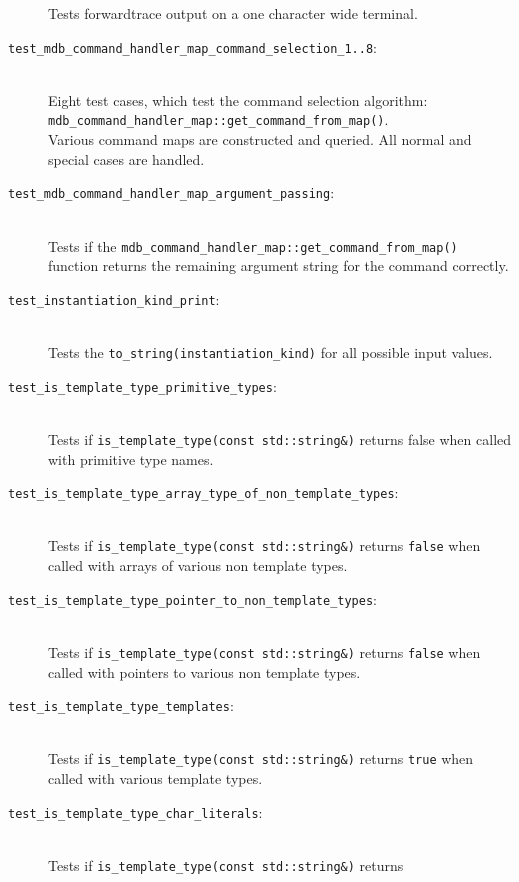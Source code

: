 \begin{description}
        Tests forwardtrace output on a one character wide terminal.
    \item[\texttt{test\_mdb\_command\_handler\_map\_command\_selection\_1..8}:] \hfill \\
        Eight test cases, which test the command selection algorithm: \\
        \texttt{mdb\_command\_handler\_map::get\_command\_from\_map()}. \\
        Various command maps are constructed and queried. All normal and
        special cases are handled.
    \item[\texttt{test\_mdb\_command\_handler\_map\_argument\_passing}:] \hfill \\
        Tests if the
        \texttt{mdb\_command\_handler\_map::get\_command\_from\_map()}
        function returns the remaining argument string for the command
        correctly.
    \item[\texttt{test\_instantiation\_kind\_print}:] \hfill \\
        Tests the \texttt{to\_string(instantiation\_kind)} for all possible
        input values.
    \item[\texttt{test\_is\_template\_type\_primitive\_types}:] \hfill \\
        Tests if \texttt{is\_template\_type(const std::string\&)} returns
        false when called with primitive type names.
    \item[\texttt{test\_is\_template\_type\_array\_type\_of\_non\_template\_types}:] \hfill \\
        Tests if \texttt{is\_template\_type(const std::string\&)} returns
        \texttt{false} when called with arrays of various non template types.
    \item[\texttt{test\_is\_template\_type\_pointer\_to\_non\_template\_types}:] \hfill \\
        Tests if \texttt{is\_template\_type(const std::string\&)} returns
        \texttt{false} when called with pointers to various non template types.
    \item[\texttt{test\_is\_template\_type\_templates}:] \hfill \\
        Tests if \texttt{is\_template\_type(const std::string\&)} returns
        \texttt{true} when called with various template types.
    \item[\texttt{test\_is\_template\_type\_char\_literals}:] \hfill \\
        Tests if \texttt{is\_template\_type(const std::string\&)} returns

\end{description}
